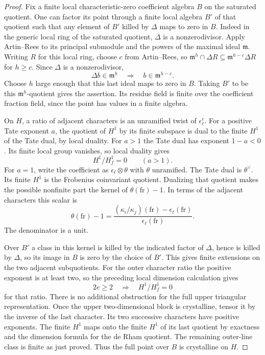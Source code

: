 \begin{proof}
Fix a finite local characteristic-zero coefficient
algebra \(B\) on the saturated quotient. One can
factor its point through a finite local algebra
\(B'\) of that quotient such that any element of
\(B'\) killed by \(\Delta\) maps to zero in \(B\).
Indeed in the generic local ring of the saturated
quotient, \(\Delta\) is a nonzerodivisor. Apply
Artin--Rees to its principal submodule and the
powers of the maximal ideal \(\mathfrak m\).
Writing \(R\) for this local ring, choose \(c\) from Artin--Rees,
so \(\mathfrak m^h\cap\Delta R\subseteq\mathfrak m^{h-c}\Delta R\)
for \(h\ge c\). Since \(\Delta\) is a nonzerodivisor,
\[
 \Delta b\in\mathfrak m^h\quad\Longrightarrow\quad
 b\in\mathfrak m^{h-c}.
\]
Choose \(h\) large enough that this last ideal maps to zero in \(B\). Taking
\(B'\) to be this \(\mathfrak m^h\)-quotient
gives the assertion. Its residue field is
finite over the coefficient fraction field,
since the point has values in a finite
algebra.

On \(H\), a ratio of adjacent characters is an
unramified twist of \(\epsilon_\ell^e\).
For a positive Tate exponent \(a\), the
quotient of \(H^1\) by its finite subspace
is dual to the finite \(H^1\) of the Tate
dual, by local duality. For \(a>1\) the Tate dual has exponent \(1-a<0\). Its finite local group vanishes, so local duality gives
\[
 H^1/H_f^1=0\qquad(a>1).
\] For \(a=1\), write the coefficient as
\(\epsilon_\ell\otimes\theta\) with \(\theta\) unramified.
The Tate dual is \(\theta^\vee\). Its finite
\(H^1\) is the Frobenius coinvariant quotient.
Dualizing that quotient makes the possible nonfinite
part the kernel of \(\theta(\mathrm{fr})-1\).
In terms of the adjacent characters this scalar is
\[
 \theta(\mathrm{fr})-1
  = \frac{(\kappa_i/\kappa_j)(\mathrm{fr})
                          -\epsilon_\ell(\mathrm{fr})}
          {\epsilon_\ell(\mathrm{fr})}.
\]
The denominator is a unit.

Over \(B'\) a class in this
kernel is killed by the indicated factor of \(\Delta\),
hence is killed by \(\Delta\), so its image in \(B\)
is zero by the choice of \(B'\). This gives finite
extensions on the two adjacent subquotients.
For the outer character ratio the positive exponent is at least two, so the preceding local dimension calculation gives
\[
 2e\ge2\quad\Longrightarrow\quad H^1/H_f^1=0
\]
for that ratio.
There is no additional obstruction for the
full upper triangular representation. Once
the upper two-dimensional block is crystalline,
tensor it by the inverse of the last character.
Its two successive characters have positive
exponents. The finite \(H^1\) maps onto the
finite \(H^1\) of its last quotient by exactness
and the dimension formula for the de Rham
quotient. The remaining outer-line class is
finite as just proved. Thus the full point
over \(B\) is crystalline on \(H\).


\end{proof}
